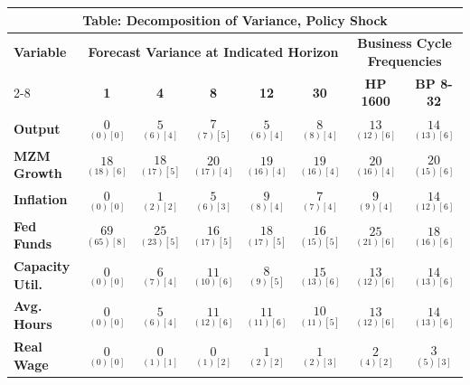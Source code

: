 \documentclass{article}
\begin{document}
 \begin{tabular}{|l|c|@{}c|c|@{}c|c|@{}c|c|} 
 \hline 
 \multicolumn{8}{|c|}{\textbf{Table: Decomposition of Variance, Policy Shock}} \\ \hline 
 \textbf{Variable} & \multicolumn{5}{|c}{\textbf{Forecast Variance at 
 Indicated Horizon}} & \multicolumn{2}{|c|}{\textbf{Business Cycle 
 Frequencies}} \\ \cline{2-8} 
 & \textbf{1} & \textbf{4} & \textbf{8} & \textbf{12} & \textbf{30} & \textbf{%
 HP 1600} & \textbf{BP 8-32} \\ \hline\hline 
 \textbf{Output} & $\underset{(  0) [  0]}{  0}$ & $\underset{(  6) [  4]}{  5}$ & $\underset{(  7) [  5]}{  7}$ & $\underset{(  6) [  4]}{  5}$ & $\underset{(  8) [  4]}{  8}$ & $\underset{( 12) [  6]}{ 13}$ & $\underset{( 13) [  6]}{ 14}$ \\ \hline 
 \textbf{MZM Growth} & $\underset{( 18) [  6]}{ 18}$ & $\underset{( 17) [  5]}{ 18}$ & $\underset{( 17) [  4]}{ 20}$ & $\underset{( 16) [  4]}{ 19}$ & $\underset{( 16) [  4]}{ 19}$ & $\underset{( 16) [  4]}{ 20}$ & $\underset{( 15) [  6]}{ 20}$ \\ \hline 
 \textbf{Inflation} & $\underset{(  0) [  0]}{  0}$ & $\underset{(  2) [  2]}{  1}$ & $\underset{(  6) [  3]}{  5}$ & $\underset{(  8) [  4]}{  9}$ & $\underset{(  7) [  4]}{  7}$ & $\underset{(  9) [  4]}{  9}$ & $\underset{( 12) [  6]}{ 14}$ \\ \hline 
 \textbf{Fed Funds} & $\underset{( 65) [  8]}{ 69}$ & $\underset{( 23) [  5]}{ 25}$ & $\underset{( 17) [  5]}{ 16}$ & $\underset{( 17) [  5]}{ 18}$ & $\underset{( 15) [  5]}{ 16}$ & $\underset{( 21) [  6]}{ 25}$ & $\underset{( 16) [  6]}{ 18}$ \\ \hline 
 \textbf{Capacity Util.} & $\underset{(  0) [  0]}{  0}$ & $\underset{(  7) [  4]}{  6}$ & $\underset{( 10) [  6]}{ 11}$ & $\underset{(  9) [  5]}{  8}$ & $\underset{( 13) [  6]}{ 15}$ & $\underset{( 12) [  6]}{ 13}$ & $\underset{( 13) [  6]}{ 14}$ \\ \hline 
 \textbf{Avg. Hours} & $\underset{(  0) [  0]}{  0}$ & $\underset{(  6) [  4]}{  5}$ & $\underset{( 12) [  6]}{ 11}$ & $\underset{( 11) [  6]}{ 11}$ & $\underset{( 11) [  5]}{ 10}$ & $\underset{( 12) [  6]}{ 13}$ & $\underset{( 13) [  6]}{ 14}$ \\ \hline 
 \textbf{Real Wage} &  $\underset{(  0) [  0]}{  0}$ & $\underset{(  1) [  1]}{  0}$ & $\underset{(  1) [  2]}{  0}$ & $\underset{(  2) [  2]}{  1}$ & $\underset{(  2) [  3]}{  1}$ & $\underset{(  4) [  2]}{  2}$ & $\underset{(  5) [  3]}{  3}$ \\ \hline 

\end{tabular}
\end{document}
